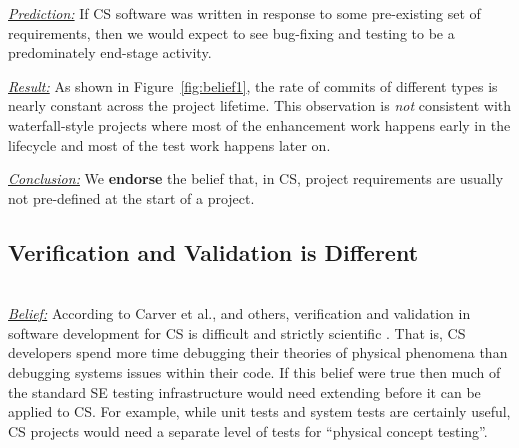 \documentclass[sigconf,review,anonymous]{acmart}
\newcommand{\bi}{\begin{itemize}}
\newcommand{\ei}{\end{itemize}}
\newcommand{\fig}[1]{Figure~\ref{fig:#1}}
\newenvironment{RQ}{\vspace{1mm}\begin{tcolorbox}[enhanced,width=3.4in,size=fbox,colback=red!5!white,drop shadow southeast,sharp corners]}{\end{tcolorbox}}
\begin{document}


\noindent \textit{\underline{Prediction:}} If CS software was written in response to some pre-existing set of requirements, then
we would expect to see bug-fixing and testing to be a predominately end-stage activity.






\noindent \textit{\underline{Result:}} 
As shown in \fig{belief1}, the rate
of commits of different types
is nearly constant across the project
lifetime. This observation is {\em not} consistent with 
waterfall-style projects where most of the enhancement work happens early in the lifecycle and most of the test work happens later on.
\vspace{-2mm}
\begin{RQ}
\textit{\underline{Conclusion:}}
We \textbf{endorse} the belief that, in CS, project requirements are usually not pre-defined
at the start of a project.
\end{RQ}
 





\subsection{Verification and Validation is Different}~\\
\textit{\underline{Belief:}} 
According to Carver et al., and others, 
verification and validation in software development for CS is difficult and strictly scientific \cite{carver07_environment, kanewala13_testing, carver06_hpc, Prabhu11_cssurvey, basili08_hpc}.
That is, CS developers spend more time debugging their theories
of physical phenomena than debugging systems issues within their code.
If this belief were true then much of the standard SE testing
infrastructure would need extending before it can be applied to CS. For example,
while unit tests and system tests are certainly useful, CS projects would need a separate level of tests for ``physical concept testing''. 
\end{document}
